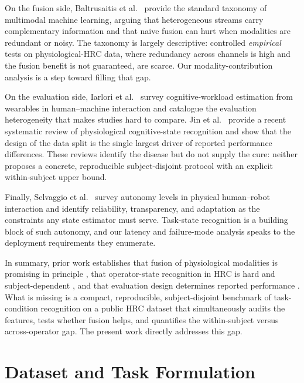 \documentclass{llncs}
\begin{document}
On the fusion side, Baltrusaitis et al.~\cite{baltrusaitis2019multimodal} provide the
standard taxonomy of multimodal machine learning, arguing that heterogeneous streams
carry complementary information and that naive fusion can hurt when modalities are
redundant or noisy. The taxonomy is largely descriptive: controlled \emph{empirical}
tests on physiological-\ac{HRC} data, where redundancy across channels is high and the
fusion benefit is not guaranteed, are scarce. Our modality-contribution analysis is a
step toward filling that gap.

On the evaluation side, Iarlori et al.~\cite{iarlori2024cognitiveworkload} survey
cognitive-workload estimation from wearables in human--machine interaction and
catalogue the evaluation heterogeneity that makes studies hard to compare.
Jin et al.~\cite{jin2025cognitivestate} provide a recent systematic review of
physiological cognitive-state recognition and show that the design of the data split
is the single largest driver of reported performance differences. These reviews
identify the disease but do not supply the cure: neither proposes a concrete,
reproducible subject-disjoint protocol with an explicit within-subject upper bound.

Finally, Selvaggio et al.~\cite{selvaggio2021autonomy} survey autonomy levels in
physical human--robot interaction and identify reliability, transparency, and
adaptation as the constraints any state estimator must serve. Task-state recognition
is a building block of such autonomy, and our latency and failure-mode analysis speaks
to the deployment requirements they enumerate.

In summary, prior work establishes that fusion of physiological modalities is
promising in principle \cite{baltrusaitis2019multimodal}, that operator-state
recognition in \ac{HRC} is hard and subject-dependent
\cite{bussolan2025multiphysiohrc,bussolan2024stressdetector,borghi2025operatorstress,aygun2022assistive},
and that evaluation design determines reported performance
\cite{jin2025cognitivestate,iarlori2024cognitiveworkload}. What is missing is a
compact, reproducible, subject-disjoint benchmark of task-condition recognition on a
public \ac{HRC} dataset that simultaneously audits the features, tests whether fusion
helps, and quantifies the within-subject versus across-operator gap. The present work
directly addresses this gap.

\section{Dataset and Task Formulation}
\label{sec:dataset}
\end{document}
